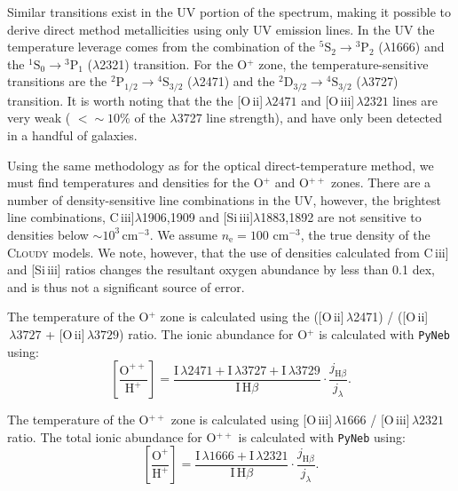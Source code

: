 \documentclass[preprint2]{aastex62}
\newcommand{\Cloudy}{\textsc{Cloudy}\xspace}
\newcommand{\oiii}{[O\,{\sc iii}]\xspace}
\newcommand{\oii}{[O\,{\sc ii}]\xspace}
\newcommand{\SiuIII}{[Si\,{\sc iii}]\xspace}
\newcommand{\ciii}{C\,{\sc iii}]\xspace}
\newcommand{\XXX}{{\bf \color{red}{XXX} }}
\begin{document}
Similar transitions exist in the UV portion of the spectrum, making it possible to derive direct method metallicities using only UV emission lines. In the UV the temperature leverage comes from the combination of the ${}^5 \mathrm{S}_2 \rightarrow {}^3 \mathrm{P}_2$ ($\lambda$1666) and the ${}^1 \mathrm{S}_0 \rightarrow {}^3 \mathrm{P}_1$ ($\lambda$2321) transition. For the O$^{+}$ zone, the temperature-sensitive transitions are the ${}^2 \mathrm{P}_{1/2} \rightarrow {}^4 \mathrm{S}_{3/2}$ ($\lambda$2471) and the ${}^2 \mathrm{D}_{3/2} \rightarrow {}^4 \mathrm{S}_{3/2}$ ($\lambda$3727) transition. It is worth noting that the the \oii$\,\lambda2471$ and \oiii$\,\lambda2321$ lines are very weak (\XXX $<{\sim}10$\% of the $\lambda$3727 line strength), and have only been detected in a handful of galaxies.

Using the same methodology as for the optical direct-temperature method, we must find temperatures and densities for the O$^{+}$ and O$^{++}$ zones. There are a number of density-sensitive line combinations in the UV, however, the brightest line combinations, \ciii$\lambda$1906,1909 and \SiuIII$\lambda$1883,1892 are not sensitive to densities below $\sim10^3\,$cm$^{-3}$. We assume $n_{\mathrm{e}} = 100$ cm$^{-3}$, the true density of the \Cloudy models. We note, however, that the use of densities calculated from \ciii and \SiuIII ratios changes the resultant oxygen abundance by less than 0.1 dex, and is thus not a significant source of error.

The temperature of the O$^{+}$ zone is calculated using the (\oii$\,\lambda$2471) / (\oii$\,\lambda 3727$ + \oii$\,\lambda 3729$) ratio. The ionic abundance for O$^{+}$ is calculated with {\tt PyNeb} using:
\begin{equation}
    \left[ \frac{\mathrm{O}^{++}}{\mathrm{H}^{+}} \right] = \frac{\mathrm{I}\,\lambda 2471 +\mathrm{I}\,\lambda 3727 + \mathrm{I}\,\lambda 3729}{\mathrm{I}\,\mathrm{H}\beta} \cdot \frac{j_{\mathrm{H}\beta}}{j_{\lambda}}.
\end{equation}

The temperature of the O$^{++}$ zone is calculated using \oiii$\,\lambda1666$ / \oiii$\,\lambda2321$ ratio. The total ionic abundance for O$^{++}$ is calculated with {\tt PyNeb} using:
\begin{equation}
    \left[ \frac{\mathrm{O}^{+}}{\mathrm{H}^{+}} \right] = \frac{\mathrm{I}\,\lambda 1666 +\mathrm{I}\,\lambda 2321}{\mathrm{I}\,\mathrm{H}\beta} \cdot \frac{j_{\mathrm{H}\beta}}{j_{\lambda}}.
\end{equation}
\end{document}
